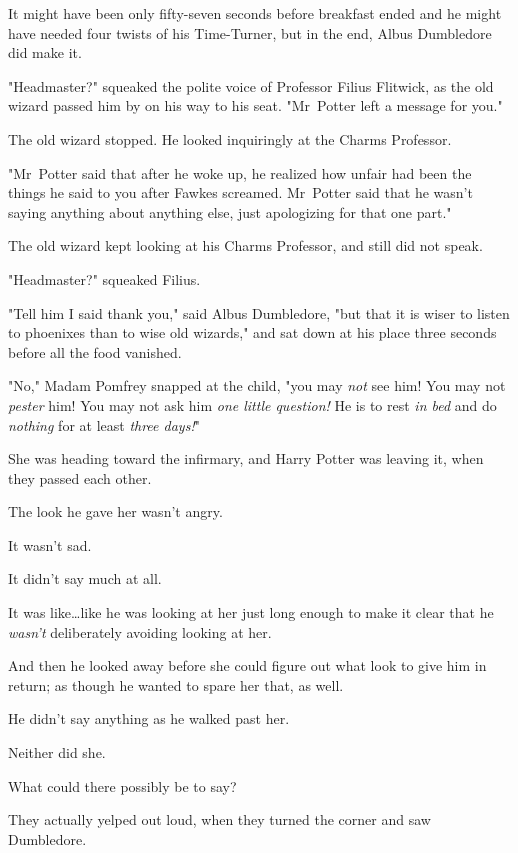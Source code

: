 It might have been only fifty-seven seconds before breakfast ended and he might
have needed four twists of his Time-Turner, but in the end, Albus Dumbledore
did make it.

"Headmaster?" squeaked the polite voice of Professor Filius Flitwick, as the
old wizard passed him by on his way to his seat. "Mr~Potter left a message for
you."

The old wizard stopped. He looked inquiringly at the Charms Professor.

"Mr~Potter said that after he woke up, he realized how unfair had been the
things he said to you after Fawkes screamed. Mr~Potter said that he wasn't
saying anything about anything else, just apologizing for that one part."

The old wizard kept looking at his Charms Professor, and still did not speak.

"Headmaster?" squeaked Filius.

"Tell him I said thank you," said Albus Dumbledore, "but that it is wiser to
listen to phoenixes than to wise old wizards," and sat down at his place three
seconds before all the food vanished.

"No," Madam Pomfrey snapped at the child, "you may \emph{not} see him! You may
not \emph{pester} him! You may not ask him \emph{one little question!} He is to
rest \emph{in bed} and do \emph{nothing} for at least \emph{three days!}"

She was heading toward the infirmary, and Harry Potter was leaving it, when
they passed each other.

The look he gave her wasn't angry.

It wasn't sad.

It didn't say much at all.

It was like…like he was looking at her just long enough to make it
clear that he \emph{wasn't} deliberately avoiding looking at her.

And then he looked away before she could figure out what look to give him in
return; as though he wanted to spare her that, as well.

He didn't say anything as he walked past her.

Neither did she.

What could there possibly be to say?

They actually yelped out loud, when they turned the corner and saw Dumbledore.

